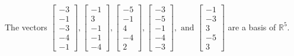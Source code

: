 \begin{exercise}
\begin{exerciseStatement}
  \end{exerciseStatement}
  \begin{exerciseAnswer}
   The vectors \(\left[\begin{array}{r}
-3 \\
-1 \\
-3 \\
-4 \\
-1
\end{array}\right] , \left[\begin{array}{r}
-1 \\
3 \\
-1 \\
-1 \\
-4
\end{array}\right] , \left[\begin{array}{r}
-5 \\
-1 \\
4 \\
-4 \\
2
\end{array}\right] , \left[\begin{array}{r}
-3 \\
-5 \\
-1 \\
-4 \\
-3
\end{array}\right] , \text{ and } \left[\begin{array}{r}
-1 \\
-3 \\
3 \\
-5 \\
3
\end{array}\right]\) 
  	 are  a basis of \(\mathbb{R}^5\).
  


  \end{exerciseAnswer}
\end{exercise}